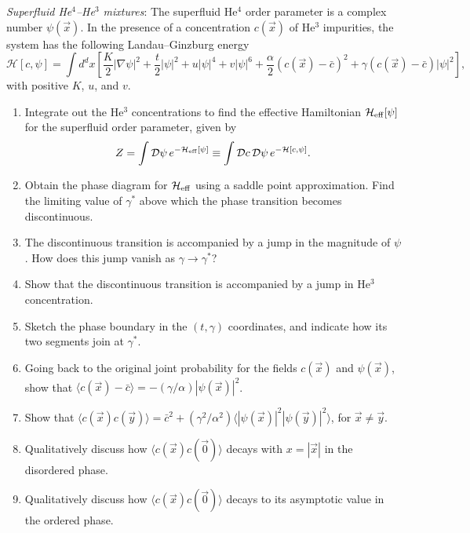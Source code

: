 \begin{problem}
    \textit{Superfluid He$^4$--He$^3$ mixtures}: The superfluid He$^4$ order parameter is a complex number $\psi(\vec{x})$. In the presence of a concentration $c(\vec{x})$ of He$^3$ impurities, the system has the following Landau--Ginzburg energy
    \[
        \mathcal{H}[c,\psi] = \int d^dx\left[\frac{K}{2}|\nabla\psi|^2 + \frac{t}{2}|\psi|^2 + u|\psi|^4 + v|\psi|^6 + \frac{\alpha}{2}(c(\vec{x}) - \bar{c})^2 + \gamma(c(\vec{x}) - \bar{c})|\psi|^2\right],
    \]
    with positive $K$, $u$, and $v$.

    \begin{enumerate}
        \item[(a)] Integrate out the He$^3$ concentrations to find the effective Hamiltonian $\mathcal{H}_{\rm eff}[\psi]$ for the superfluid order parameter, given by
        \[
            Z = \int \mathcal{D}\psi\,e^{-\mathcal{H}_{\rm eff}[\psi]} \equiv \int \mathcal{D}c\,\mathcal{D}\psi\,e^{-\mathcal{H}[c,\psi]}.
        \]

        \item[(b)] Obtain the phase diagram for $\mathcal{H}_{\rm eff}$ using a saddle point approximation. Find the limiting value of $\gamma^*$ above which the phase transition becomes discontinuous.

        \item[(c)] The discontinuous transition is accompanied by a jump in the magnitude of $\psi$. How does this jump vanish as $\gamma \to \gamma^*$?

        \item[(d)] Show that the discontinuous transition is accompanied by a jump in He$^3$ concentration.

        \item[(e)] Sketch the phase boundary in the $(t,\gamma)$ coordinates, and indicate how its two segments join at $\gamma^*$.

        \item[(f)] Going back to the original joint probability for the fields $c(\vec{x})$ and $\psi(\vec{x})$, show that $\langle c(\vec{x}) - \bar{c}\rangle = -(\gamma/\alpha)|\psi(\vec{x})|^2$.

        \item[(g)] Show that $\langle c(\vec{x})c(\vec{y})\rangle = \bar{c}^2 + (\gamma^2/\alpha^2)\langle|\psi(\vec{x})|^2|\psi(\vec{y})|^2\rangle$, for $\vec{x} \neq \vec{y}$.

        \item[(h)] Qualitatively discuss how $\langle c(\vec{x})c(\vec{0})\rangle$ decays with $x = |\vec{x}|$ in the disordered phase.

        \item[(i)] Qualitatively discuss how $\langle c(\vec{x})c(\vec{0})\rangle$ decays to its asymptotic value in the ordered phase.
    \end{enumerate}
\end{problem}

